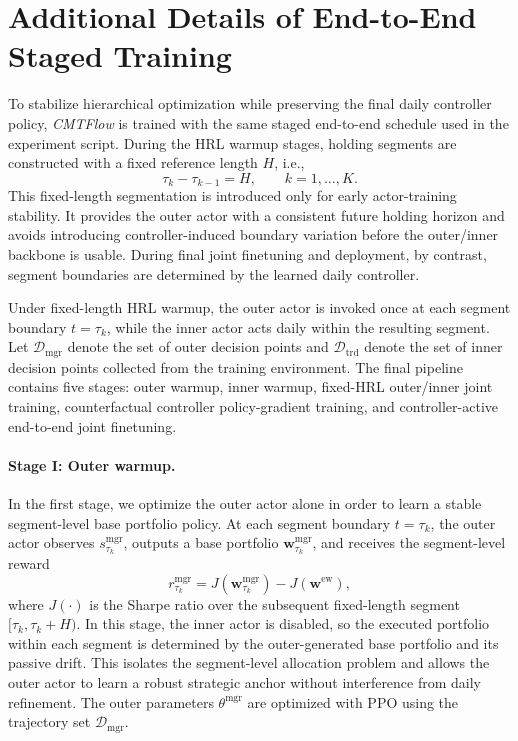 \documentclass[letterpaper]{article} %
\begin{document}
\section{Additional Details of End-to-End Staged Training}
\label{app:hier_training}

To stabilize hierarchical optimization while preserving the final daily controller policy, \textit{CMTFlow} is trained with the same staged end-to-end schedule used in the experiment script. During the HRL warmup stages, holding segments are constructed with a fixed reference length \(H\), i.e.,
\[
\tau_k-\tau_{k-1}=H,\qquad k=1,\dots,K.
\]
This fixed-length segmentation is introduced only for early actor-training stability. It provides the outer actor with a consistent future holding horizon and avoids introducing controller-induced boundary variation before the outer/inner backbone is usable. During final joint finetuning and deployment, by contrast, segment boundaries are determined by the learned daily controller.

Under fixed-length HRL warmup, the outer actor is invoked once at each segment boundary \(t=\tau_k\), while the inner actor acts daily within the resulting segment. Let \(\mathcal{D}_{\mathrm{mgr}}\) denote the set of outer decision points and \(\mathcal{D}_{\mathrm{trd}}\) denote the set of inner decision points collected from the training environment. The final pipeline contains five stages: outer warmup, inner warmup, fixed-HRL outer/inner joint training, counterfactual controller policy-gradient training, and controller-active end-to-end joint finetuning.

\paragraph{Stage I: Outer warmup.}
In the first stage, we optimize the outer actor alone in order to learn a stable segment-level base portfolio policy. At each segment boundary \(t=\tau_k\), the outer actor observes \(s_{\tau_k}^{\mathrm{mgr}}\), outputs a base portfolio \(\mathbf{w}^{\mathrm{mgr}}_{\tau_k}\), and receives the segment-level reward
\[
r_{\tau_k}^{\mathrm{mgr}}
=
J\!\left(\mathbf{w}^{\mathrm{mgr}}_{\tau_k}\right)
-
J\!\left(\mathbf{w}^{\mathrm{ew}}\right),
\]
where \(J(\cdot)\) is the Sharpe ratio over the subsequent fixed-length segment \([\tau_k,\tau_k+H)\). In this stage, the inner actor is disabled, so the executed portfolio within each segment is determined by the outer-generated base portfolio and its passive drift. This isolates the segment-level allocation problem and allows the outer actor to learn a robust strategic anchor without interference from daily refinement. The outer parameters \(\theta^{\mathrm{mgr}}\) are optimized with PPO using the trajectory set \(\mathcal{D}_{\mathrm{mgr}}\).
\end{document}
